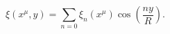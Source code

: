 \begin{equation}
  \xi(x^\mu,y)
    = \sum_{n=0} \xi_n(x^\mu) \cos\left(\frac{n y}{R}\right).
\label{eq:u1-gtp}
\end{equation}

